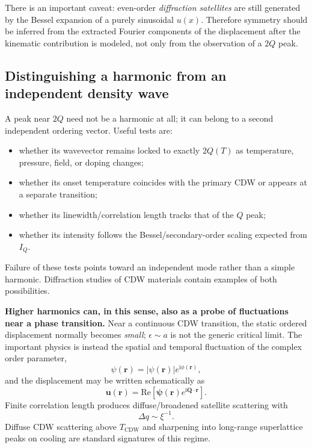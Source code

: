 \documentclass[11pt]{article}
\newcommand{\e}{\epsilon}
\newcommand{\ii}{\mathrm{i}}
\newcommand{\bQ}{\mathbf{Q}}
\newcommand{\br}{\mathbf{r}}
\newcommand{\bu}{\mathbf{u}}
\begin{document}
There is an important caveat: even-order \emph{diffraction satellites} are still generated by the Bessel expansion of a purely sinusoidal $u(x)$.  Therefore symmetry should be inferred from the extracted Fourier components of the displacement after the kinematic contribution is modeled, not only from the observation of a $2Q$ peak.

\subsection*{Distinguishing a harmonic from an independent density wave}
A peak near $2Q$ need not be a harmonic at all; it can belong to a second independent ordering vector.  Useful tests are:
\begin{itemize}[leftmargin=1.6em]
    \item whether its wavevector remains locked to exactly $2Q(T)$ as temperature, pressure, field, or doping changes;
    \item whether its onset temperature coincides with the primary CDW or appears at a separate transition;
    \item whether its linewidth/correlation length tracks that of the $Q$ peak;
    \item whether its intensity follows the Bessel/secondary-order scaling expected from $I_Q$.
\end{itemize}
Failure of these tests points toward an independent mode rather than a simple harmonic.  Diffraction studies of CDW materials contain examples of both possibilities.\cite{vanSmaalen2005}

\textbf{Higher harmonics can, in this sense, also as a probe of fluctuations near a phase transition. }Near a continuous CDW transition, the static ordered displacement normally becomes \emph{small}; $\e\sim a$ is not the generic critical limit.  The important physics is instead the spatial and temporal fluctuation of the complex order parameter,
\begin{equation}
    \psi(\br)=|\psi(\br)|e^{\ii\phi(\br)},
\end{equation}
and the displacement may be written schematically as
\begin{equation}
    \bu(\br)=\mathrm{Re}\left[\bm{\psi}(\br)e^{\ii\bQ\cdot\br}\right].
\end{equation}
Finite correlation length produces diffuse/broadened satellite scattering with
\begin{equation}
    \Delta q\sim\xi^{-1}.
\end{equation}
Diffuse CDW scattering above $T_{\mathrm{CDW}}$ and sharpening into long-range superlattice peaks on cooling are standard signatures of this regime.\cite{vanSmaalen2005}
\end{document}
